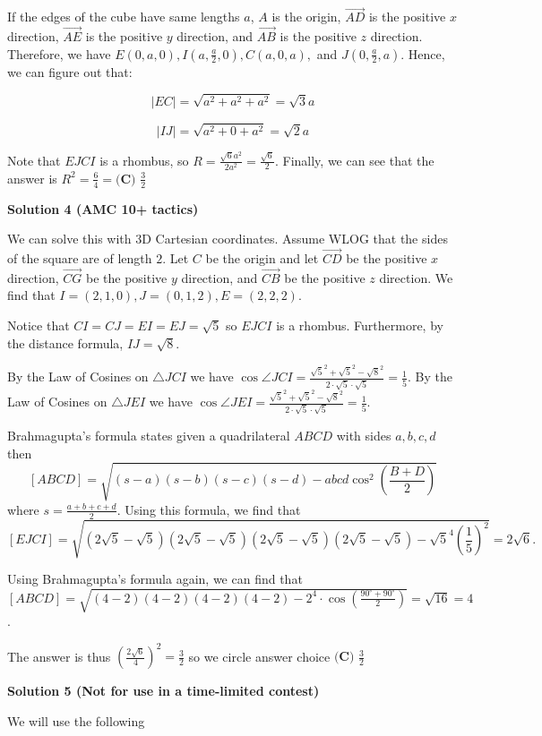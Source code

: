 \begin{enumerate}
If the edges of the cube have same lengths $a$, $A$ is the origin, $\vec{AD }$ is the positive $x$ direction, $\vec{AE}$ is the positive $y$ direction, and $\vec{AB }$ is the positive $z$ direction. Therefore, we have $E(0,a,0), I(a,\frac{a}{2},0), C(a,0,a),$ and $J(0,\frac{a}{2},a)$. Hence, we can figure out that:

 
 \[|EC|=\sqrt{a^2 + a^2 + a^2}=\sqrt{3}a\]

 \[|IJ|=\sqrt{a^2 + 0 + a^2}=\sqrt{2}a\]

 Note that $EJCI$ is a rhombus, so $R=\frac{\sqrt{6}a^2}{2a^2}=\frac{\sqrt{6}}{2}$. Finally, we can see that the answer is $R^2=\frac{6}{4}=\boxed{\textbf{(C) } \frac{3}{2}}$




\textbf{Solution 4 (AMC 10+ tactics)}

We can solve this with 3D Cartesian coordinates. Assume WLOG that the sides of the square are of length $2$.  Let $C$ be the origin and let $\vec{CD}$ be the positive $x$ direction, $\vec{CG}$ be the positive $y$ direction, and $\vec{CB}$ be the positive $z$ direction. We find that $I=(2,1,0),J=(0,1,2),E=(2,2,2)$. 

 Notice that $CI=CJ=EI=EJ=\sqrt{5}$ so $EJCI$ is a rhombus. Furthermore, by the distance formula, $IJ=\sqrt8$. 

 By the Law of Cosines on $\triangle JCI$ we have $\cos \angle JCI=\frac{\sqrt5^2+ \sqrt5^2-\sqrt8^2}{2\cdot \sqrt5\cdot \sqrt5}=\frac 15$. By the Law of Cosines on $\triangle JEI$ we have $\cos \angle JEI=\frac{\sqrt5^2+ \sqrt5^2-\sqrt8^2}{2\cdot \sqrt5\cdot \sqrt5}=\frac 15$.

 Brahmagupta's formula states given a quadrilateral $ABCD$ with sides $a,b,c,d$ then 
 \[[ABCD]=\sqrt{(s-a)(s-b)(s-c)(s-d)-abcd\cos^2\left({\frac{B+D}{2}}\right)}\]where $s=\frac{a+b+c+d}2$. Using this formula, we find that
 \[[EJCI]=\sqrt{(2\sqrt5-\sqrt5)(2\sqrt5-\sqrt5)(2\sqrt5-\sqrt5)(2\sqrt5-\sqrt5)-\sqrt 5^4(\frac 15)^2}=2\sqrt{6}.\] 

 Using Brahmagupta's formula again, we can find that $[ABCD]=\sqrt{(4-2)(4-2)(4-2)(4-2)-2^4\cdot \cos \left(\frac{90^\circ+90^\circ}2\right)}=\sqrt{16}=4$. 

 The answer is thus $\left(\frac{2\sqrt6}{4}\right)^2=\frac 32$ so we circle answer choice $\boxed{\textbf{(C) } \frac{3}{2}}$




\textbf{Solution 5 (Not for use in a time-limited contest)}

We will use the following


\end{enumerate}
